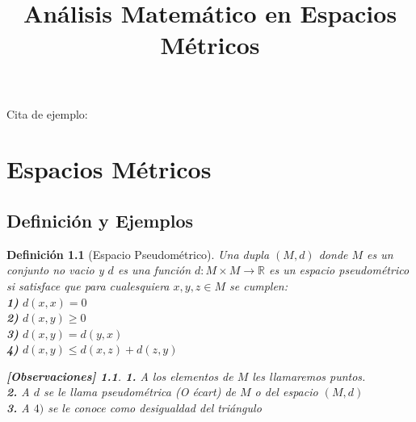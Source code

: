 \documentclass[oneside]{book} %
\theoremstyle{Teorema}
\newtheorem{Definicion}{Definición}[chapter]
\theoremstyle{Ejemplos}
\theoremstyle{[Obs]}
\newtheorem*{Obs}{[Observaciones]}
\renewcommand{\{}{\left\lbrace} %
\renewcommand{\}}{\right\rbrace} %
\newcommand{\R}{\mathbb{R}} %
\begin{document}
	\color{white} 
	Cita de ejemplo: \cite{DUMMY:1}
	\color{black} 

	\tableofcontents
	\justify
	\title{Análisis Matemático en Espacios Métricos}

	\chapter{Espacios Métricos}

		\section{Definición y Ejemplos}

			\begin{Definicion}[Espacio Pseudométrico]
				
				Una dupla $(M, d)$ donde $M$ es un conjunto no vacio y $d$ es una función $d : M \times M \to \R$ es un espacio pseudométrico si satisface que para cualesquiera $x, y, z \in M$ se cumplen: \\

				\textbf{1)} $d(x, x) = 0$ \\

				\textbf{2)} $d(x, y) \geq 0$ \\

				\textbf{3)} $d(x, y) = d(y, x)$ \\

				\textbf{4)} $d(x, y) \leq d(x, z) + d(z, y)$ \\

				\begin{Obs}
				
					\hfill
				
					\textbf{1.} A los elementos de $M$ les llamaremos puntos. \\

					\textbf{2.} A $d$ se le llama pseudométrica (O écart) de $M$ o del espacio $(M, d)$ \\

					\textbf{3.} A \textbf{$4)$} se le conoce como desigualdad del triángulo
				
				\end{Obs}

			\end{Definicion}
\end{document}
